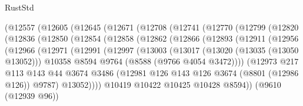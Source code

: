 \begin{lexlean}{RustStd}
\begin{coremodule}
          (@12557
            (@12605
              (@12645
                (@12671
                  (@12708
                    (@12741
                      (@12770
                        (@12799
                          (@12820
                            (@12836
                              (@12850
                                (@12854
                                  (@12858
                                    (@12862
                                      (@12866
                                        (@12893
                                          (@12911
                                            (@12956
                                              (@12966
                                                (@12971
                                                  (@12991
                                                    (@12997
                                                      (@13003
                                                        (@13017
                                                          (@13020 (@13035 (@13050 @13052)))
                                                          @10358
                                                          @8594
                                                          @9764
                                                          (@8588 (@9766 @4054 @3472))))
                                                      (@12973
                                                        @217
                                                        @113
                                                        @143
                                                        @44
                                                        @3674
                                                        @3486
                                                        (@12981
                                                          @126
                                                          @143
                                                          @126
                                                          @3674
                                                          (@8801 (@12986 @126))
                                                          @9787)
                                                        @13052))))
                                                @10419
                                                @10422
                                                @10425
                                                @10428
                                                @8594))
                                            (@9610 (@12939 @96))

\end{coremodule}
\end{lexlean}
